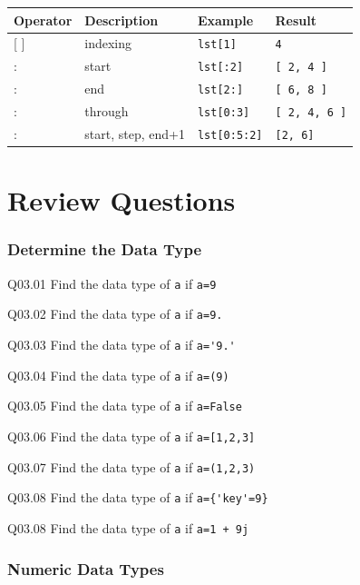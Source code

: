 \documentclass{book}
\newenvironment{problems}{}{}  %
\begin{document}
\begin{longtable}[]{@{}llll@{}}
\toprule
Operator & Description & Example & Result\tabularnewline
\midrule
\endhead
{[} {]} & indexing & \lstinline!lst[1]! & \lstinline!4!\tabularnewline
: & start & \lstinline!lst[:2]! & \lstinline![ 2, 4 ]!\tabularnewline
: & end & \lstinline!lst[2:]! & \lstinline![ 6, 8 ]!\tabularnewline
: & through & \lstinline!lst[0:3]! &
\lstinline![ 2, 4, 6 ]!\tabularnewline
: & start, step, end+1 & \lstinline!lst[0:5:2]! &
\lstinline![2, 6]!\tabularnewline
\bottomrule
\end{longtable}
    




    
        \section{Review Questions}\label{review-questions}
    




    
        \begin{problems}
        \subsubsection{Determine the Data Type}\label{determine-the-data-type}

Q03.01 Find the data type of \lstinline!a! if \lstinline!a=9!

Q03.02 Find the data type of \lstinline!a! if \lstinline!a=9.!

Q03.03 Find the data type of \lstinline!a! if \lstinline!a='9.'!

Q03.04 Find the data type of \lstinline!a! if \lstinline!a=(9)!

Q03.05 Find the data type of \lstinline!a! if \lstinline!a=False!

Q03.06 Find the data type of \lstinline!a! if \lstinline!a=[1,2,3]!

Q03.07 Find the data type of \lstinline!a! if \lstinline!a=(1,2,3)!

Q03.08 Find the data type of \lstinline!a! if \lstinline!a={'key'=9}!

Q03.08 Find the data type of \lstinline!a! if \lstinline!a=1 + 9j!
        \end{problems}

    




    
        \subsubsection{Numeric Data Types}\label{numeric-data-types}
\end{document}
